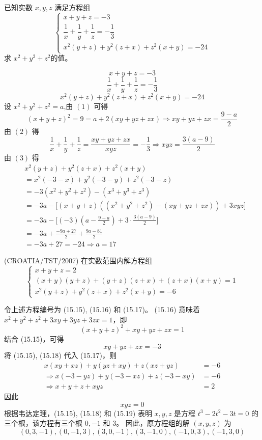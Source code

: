 \begin{questions}
    \question 已知实数 $x, y, z$ 满足方程组
    \[
    \begin{cases}
    x+y+z=-3 \\[1mm]
    \dfrac{1}{x}+\dfrac{1}{y}+\dfrac{1}{z}=-\dfrac{1}{3} \\[1mm]
    x^2(y+z)+y^2(z+x)+z^2(x+y)=-24
    \end{cases}
    \]
    求 $x^2+y^2+z^2$的值。
    \begin{solution}
        \[
        x+y+z=-3 \tag{1}
        \]
        \[
        \dfrac{1}{x}+\dfrac{1}{y}+\dfrac{1}{z}=-\dfrac{1}{3} \tag{2}
        \]
        \[
        x^2(y+z)+y^2(z+x)+z^2(x+y)=-24 \tag{3}
        \]
        设 $x^2+y^2+z^2 = a$,由 $(1)$ 可得
        \[
        (x+y+z)^2 = 9 = a + 2(xy+yz+zx) \Rightarrow xy+yz+zx = \frac{9-a}{2}
        \]
        由 $(2)$ 得
        \[
        \frac{1}{x}+\frac{1}{y}+\frac{1}{z} = \frac{xy+yz+zx}{xyz} = -\frac{1}{3} \Rightarrow xyz = \frac{3(a-9)}{2}
        \]
        由 $(3)$ 得
        \begin{align*}
        &x^2(y+z) + y^2(z+x) + z^2(x+y) \\
        &= x^2(-3-x) + y^2(-3-y) + z^2(-3-z) \\ 
        &= -3(x^2+y^2+z^2) - (x^3+y^3+z^3) \\ 
        &= -3a - \Big[ (x+y+z)((x^2+y^2+z^2)-(xy+yz+zx)) + 3xyz \Big] \\
        &= -3a - \big[ (-3)\left(a - \frac{9-a}{2}\right) + 3 \cdot \frac{3(a-9)}{2} \big] \\
        &= -3a + \frac{-9a+27}{2} + \frac{9a-81}{2} \\
        &= -3a + 27=-24 \Rightarrow a = 17
        \end{align*}
    \end{solution}

    \question (CROATIA/TST/2007) 在实数范围内解方程组
\[
\begin{cases}
x + y + z = 2 \\
(x + y)(y + z) + (y + z)(z + x) + (z + x)(x + y) = 1  \\
x^2(y + z) + y^2(z + x) + z^2(x + y) = -6
\end{cases}
\]

\begin{solution}
令上述方程编号为 (15.15), (15.16) 和 (15.17)。
(15.16) 意味着 $x^2 + y^2 + z^2 + 3xy + 3yz + 3zx = 1$，即
\[
(x + y + z)^2 + xy + yz + zx = 1
\]
结合 (15.15)，可得
\[
xy + yz + zx = -3 \tag{15.18}
\]
将 (15.15), (15.18) 代入 (15.17)，则
\begin{align*}
x(xy + xz) + y(yz + xy) + z(xz + yz) &= -6 \\
\Rightarrow x(-3 - yz) + y(-3 - xz) + z(-3 - xy) &= -6 \\
\Rightarrow x + y + z + xyz &= 2
\end{align*}
因此
\[
xyz = 0 \tag{15.19}
\]
根据韦达定理，(15.15), (15.18) 和 (15.19) 表明 $x, y, z$ 是方程 $t^3 - 2t^2 - 3t = 0$ 的三个根，该方程有三个根 $0, -1$ 和 $3$。
因此，原方程组的解 $(x, y, z)$ 为
\[
(0, 3, -1), (0, -1, 3), (3, 0, -1), (3, -1, 0), (-1, 0, 3), (-1, 3, 0)
\]
\end{solution}


\end{questions}
